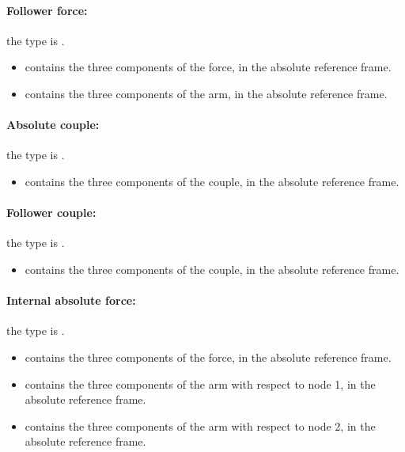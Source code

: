 \paragraph{Follower force:}
the type is .
\begin{itemize}
\item {} contains the three components of the force, in the absolute reference frame.
\item {} contains the three components of the arm, in the absolute reference frame.
\end{itemize}

\paragraph{Absolute couple:}
the type is .
\begin{itemize}
\item {} contains the three components of the couple, in the absolute reference frame.
\end{itemize}

\paragraph{Follower couple:}
the type is .
\begin{itemize}
\item {} contains the three components of the couple, in the absolute reference frame.
\end{itemize}

\paragraph{Internal absolute force:}
the type is .
\begin{itemize}
\item {} contains the three components of the force, in the absolute reference frame.
\item {} contains the three components of the arm with respect to node 1, in the absolute reference frame.
\item {} contains the three components of the arm with respect to node 2, in the absolute reference frame.
\end{itemize}

